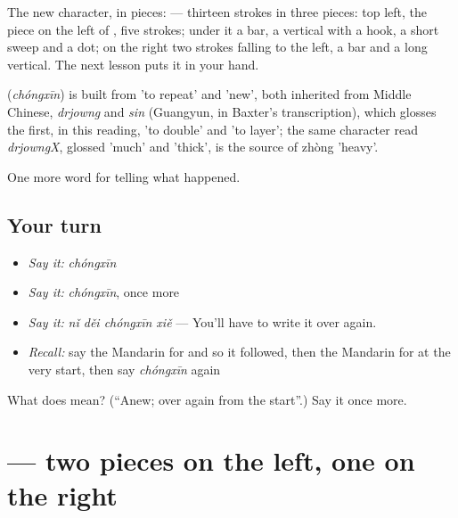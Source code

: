 The new character, in pieces:  — thirteen strokes in three pieces: top left, the piece on the left of , five strokes; under it a bar, a vertical with a hook, a short sweep and a dot; on the right two strokes falling to the left, a bar and a long vertical. The next lesson puts it in your hand.

\begin{cousinweb}
\textbf{} (\emph{chóngxīn}) is built from  'to repeat' and  'new', both inherited from Middle Chinese, \emph{drjowng} and \emph{sin} (Guangyun, in Baxter's transcription), which glosses the first, in this reading, 'to double' and 'to layer'; the same character read \emph{drjowngX}, glossed 'much' and 'thick', is the source of zhòng 'heavy'.
\end{cousinweb}

\begin{grammarlens}[title={What you've built}]
One more word for telling what happened.
\end{grammarlens}

\subsection*{Your turn}
\begin{itemize}
\raggedright
  \item \emph{Say it:} \emph{chóngxīn}
  \item \emph{Say it:} \emph{chóngxīn}, once more
  \item \emph{Say it:} \emph{nǐ děi chóngxīn xiě} — You'll have to write it over again.
  \item \emph{Recall:} say the Mandarin for and so it followed, then the Mandarin for at the very start, then say \emph{chóngxīn} again
\end{itemize}

\begin{tcolorbox}[breakable,colback=teal!4,colframe=teal!35!black,title={Before you move on}]
What does  mean? (\textquotedblleft{}Anew; over again from the start\textquotedblright{}.) Say it once more.
\end{tcolorbox}
\section[\texorpdfstring{\zh{新} (xīn)}{新 (xīn)}]{ — two pieces on the left, one on the right}

\label{lesson:ZH-W295-xin-new}



